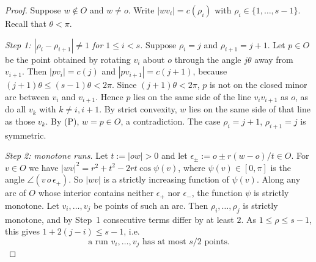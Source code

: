 \begin{proof}
Suppose $w\notin O$ and $w\ne o$. Write $|wv_i|=c(\rho_i)$ with $\rho_i\in\{1,\dots,s-1\}$. Recall that $\theta<\pi$.

\emph{Step 1: $|\rho_i-\rho_{i+1}|\ne1$ for $1\le i<s$.} Suppose $\rho_i=j$ and $\rho_{i+1}=j+1$. Let $p\in O$ be the point obtained by rotating $v_i$ about $o$ through the angle $j\theta$ away from $v_{i+1}$. Then $|pv_i|=c(j)$ and $|pv_{i+1}|=c(j+1)$, because $(j+1)\theta\le(s-1)\theta<2\pi$. Since $(j+1)\theta<2\pi$, $p$ is not on the closed minor arc between $v_i$ and $v_{i+1}$. Hence $p$ lies on the same side of the line $v_iv_{i+1}$ as $o$, as do all $v_k$ with $k\ne i,i+1$. By strict convexity, $w$ lies on the same side of that line as those $v_k$. By (P), $w=p\in O$, a contradiction. The case $\rho_i=j+1$, $\rho_{i+1}=j$ is symmetric.

\emph{Step 2: monotone runs.} Let $t:=|ow|>0$ and let $\epsilon_\pm:=o\pm r(w-o)/t\in O$. For $v\in O$ we have $|wv|^2=r^2+t^2-2rt\cos\psi(v)$, where $\psi(v)\in[0,\pi]$ is the angle $\angle(v\,o\,\epsilon_+)$. So $|wv|$ is a strictly increasing function of $\psi(v)$. Along any arc of $O$ whose interior contains neither $\epsilon_+$ nor $\epsilon_-$, the function $\psi$ is strictly monotone. Let $v_i,\dots,v_j$ be points of such an arc. Then $\rho_i,\dots,\rho_j$ is strictly monotone, and by Step~1 consecutive terms differ by at least $2$. As $1\le\rho\le s-1$, this gives $1+2(j-i)\le s-1$, i.e.
\begin{equation}\label{eq:runlength}
\text{a run } v_i,\dots,v_j \text{ has at most } s/2 \text{ points.}
\end{equation}


\end{proof}
